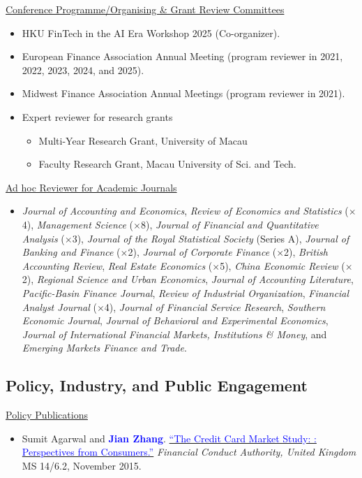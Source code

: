 \documentclass[11pt]{article}
\newcommand{\jz}{\textcolor{blue}{\textbf{Jian Zhang}}}
\newcommand{\publink}[2]{\href{#1}{\textcolor{blue}{#2}}}
\begin{document}
\underline{Conference Programme/Organising \& Grant Review Committees}
\begin{itemize}
\item HKU FinTech in the AI Era Workshop 2025 (Co-organizer).
\item European Finance Association Annual Meeting (program reviewer in 2021, 2022, 2023, 2024, and 2025).
\item Midwest Finance Association Annual Meetings (program reviewer in 2021).
\item Expert reviewer for research grants
\begin{itemize}
	\item Multi-Year Research Grant, University of Macau
	\item Faculty Research Grant, Macau University of Sci. and Tech.
\end{itemize}
\end{itemize}

\underline{Ad hoc Reviewer for Academic Journals}
\begin{itemize}
\item \emph{Journal of Accounting and Economics}, \emph{Review of Economics and Statistics} ($\times$4), \emph{Management Science} ($\times$8), \emph{Journal of Financial and Quantitative Analysis} ($\times$3), \emph{Journal of the Royal Statistical Society} (Series A), \emph{Journal of Banking and Finance} ($\times$2), \emph{Journal of Corporate Finance} ($\times$2), \emph{British Accounting Review}, \emph{Real Estate Economics} ($\times$5), \emph{China Economic Review} ($\times$2), \emph{Regional Science and Urban Economics}, \emph{Journal of Accounting Literature}, \emph{Pacific-Basin Finance Journal}, \emph{Review of Industrial Organization}, \emph{Financial Analyst Journal} ($\times$4), \emph{Journal of Financial Service Research}, \emph{Southern Economic Journal}, \emph{Journal of Behavioral and Experimental Economics}, \emph{Journal of International Financial Markets, Institutions \& Money}, and \emph{Emerging Markets Finance and Trade}.
\end{itemize}

\subsection{Policy, Industry, and Public Engagement}
\underline{Policy Publications}
\begin{itemize}
\item \textcolor{blue!70!black}{Sumit Agarwal and \jz. \publink{https://www.fca.org.uk/publication/market-studies/review-credit-card-literature.pdf}{``The Credit Card Market Study: : Perspectives from Consumers.''} \emph{Financial Conduct Authority, United Kingdom} MS 14/6.2, November 2015.}
\end{itemize}
\end{document}
